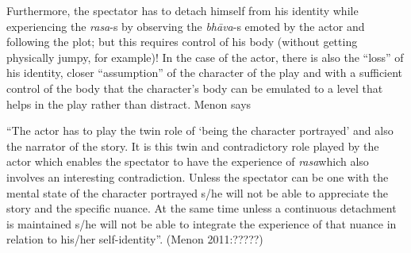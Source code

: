 Furthermore, the spectator has to detach himself from his identity while experiencing the \textsl{rasa}-s by observing the \textsl{bhāva}-s emoted by the actor and following the plot; but this requires control of his body (without getting physically jumpy, for example)! In the case of the actor, there is also the “loss” of his identity, closer “assumption” of the character of the play and with a sufficient control of the body that the character’s body can be emulated to a level that helps in the play rather than distract. Menon says 

\begin{myquote}
“The actor has to play the twin role of ‘being the character portrayed’ and also the narrator of the story. It is this twin and contradictory role played by the actor which enables the spectator to have the experience of \textsl{rasa}which also involves an interesting contradiction. Unless the spectator can be one with the mental state of the character portrayed s/he will not be able to appreciate the story and the specific nuance. At the same time unless a continuous detachment is maintained s/he will not be able to integrate the experience of that nuance in relation to his/her self-identity”. 
\hfill(Menon 2011:?????)
\end{myquote}

